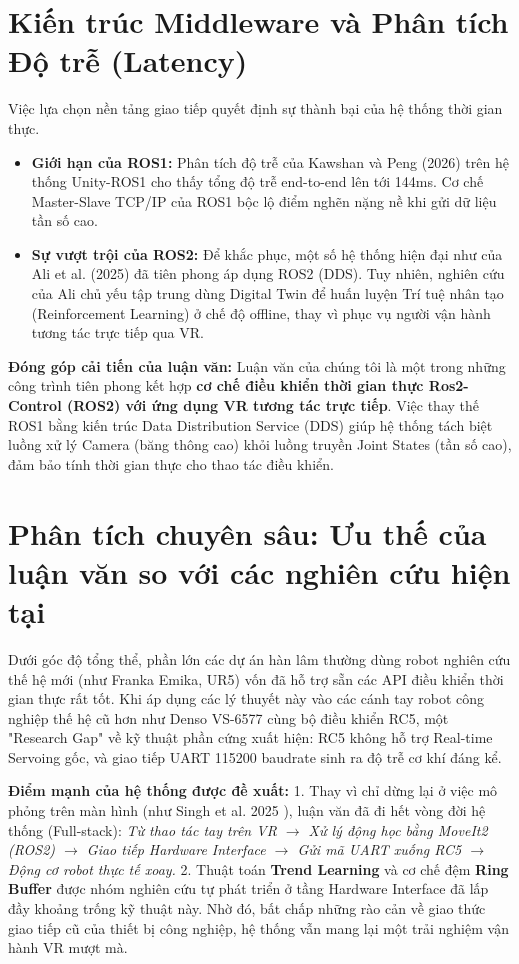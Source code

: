 \section{Kiến trúc Middleware và Phân tích Độ trễ (Latency)}
Việc lựa chọn nền tảng giao tiếp quyết định sự thành bại của hệ thống thời gian thực.
\begin{itemize}
    \item \textbf{Giới hạn của ROS1:} Phân tích độ trễ của Kawshan và Peng (2026) \cite{kawshan2026digital} trên hệ thống Unity-ROS1 cho thấy tổng độ trễ end-to-end lên tới 144ms. Cơ chế Master-Slave TCP/IP của ROS1 bộc lộ điểm nghẽn nặng nề khi gửi dữ liệu tần số cao.
    \item \textbf{Sự vượt trội của ROS2:} Để khắc phục, một số hệ thống hiện đại như của Ali et al. (2025) \cite{ali2025digital} đã tiên phong áp dụng ROS2 (DDS). Tuy nhiên, nghiên cứu của Ali chủ yếu tập trung dùng Digital Twin để huấn luyện Trí tuệ nhân tạo (Reinforcement Learning) ở chế độ offline, thay vì phục vụ người vận hành tương tác trực tiếp qua VR.
\end{itemize}

\textbf{Đóng góp cải tiến của luận văn:} Luận văn của chúng tôi là một trong những công trình tiên phong kết hợp \textbf{cơ chế điều khiển thời gian thực Ros2-Control (ROS2) với ứng dụng VR tương tác trực tiếp}. Việc thay thế ROS1 bằng kiến trúc Data Distribution Service (DDS) giúp hệ thống tách biệt luồng xử lý Camera (băng thông cao) khỏi luồng truyền Joint States (tần số cao), đảm bảo tính thời gian thực cho thao tác điều khiển.

\section{Phân tích chuyên sâu: Ưu thế của luận văn so với các nghiên cứu hiện tại}
Dưới góc độ tổng thể, phần lớn các dự án hàn lâm thường dùng robot nghiên cứu thế hệ mới (như Franka Emika, UR5) vốn đã hỗ trợ sẵn các API điều khiển thời gian thực rất tốt. Khi áp dụng các lý thuyết này vào các cánh tay robot công nghiệp thế hệ cũ hơn như Denso VS-6577 cùng bộ điều khiển RC5, một "Research Gap" về kỹ thuật phần cứng xuất hiện: RC5 không hỗ trợ Real-time Servoing gốc, và giao tiếp UART 115200 baudrate sinh ra độ trễ cơ khí đáng kể.

\textbf{Điểm mạnh của hệ thống được đề xuất:} 
1. Thay vì chỉ dừng lại ở việc mô phỏng trên màn hình (như Singh et al. 2025 \cite{singh2025comparative}), luận văn đã đi hết vòng đời hệ thống (Full-stack): \textit{Từ thao tác tay trên VR $\rightarrow$ Xử lý động học bằng MoveIt2 (ROS2) $\rightarrow$ Giao tiếp Hardware Interface $\rightarrow$ Gửi mã UART xuống RC5 $\rightarrow$ Động cơ robot thực tế xoay.}
2. Thuật toán \textbf{Trend Learning} và cơ chế đệm \textbf{Ring Buffer} được nhóm nghiên cứu tự phát triển ở tầng Hardware Interface đã lấp đầy khoảng trống kỹ thuật này. Nhờ đó, bất chấp những rào cản về giao thức giao tiếp cũ của thiết bị công nghiệp, hệ thống vẫn mang lại một trải nghiệm vận hành VR mượt mà.

